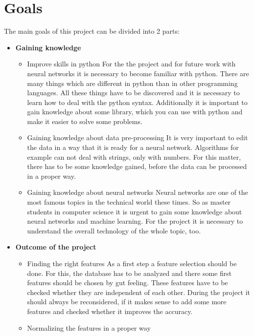 \section{Goals}
The main goals of this project can be divided into 2 parts:
\begin{itemize}
	\item \textbf{Gaining knowledge}
		\begin{itemize}
			\item Improve skills in python\newline
			For the the project and for future work with neural networks it is necessary to become familiar with python. There are many things which are different in python than in other programming languages. All these things have to be discovered and it is necessary to learn how to deal with the python syntax. Additionally it is important to gain knowledge about some library, which you can use with python and make it easier to solve some problems.
			\item Gaining knowledge about data pre-processing\newline 
			It is very important to edit the data in a way that it is ready for a neural network. Algorithms for example can not deal with strings, only with numbers. For this matter, there has to be some knowledge gained, before the data can be processed in a proper way.
			\item Gaining knowledge about neural networks\newline
			Neural networks are one of the most famous topics in the technical world these times. So as master students in computer science it is urgent to gain some knowledge about neural networks and machine learning. For the project it is necessary to understand the overall technology of the whole topic, too.
		\end{itemize}
	\item \textbf{Outcome of the project}
		\begin{itemize}
			\item Finding the right features\newline
			As a first step a feature selection should be done. For this, the database has to be analyzed and there some first features should be chosen by gut feeling. These features have to be checked whether they are independent of each other. During the project it should always be reconsidered, if it makes sense to add some more features and checked whether it improves the accuracy.
			\item Normalizing the features in a proper way\newline

\end{itemize}
\end{itemize}
